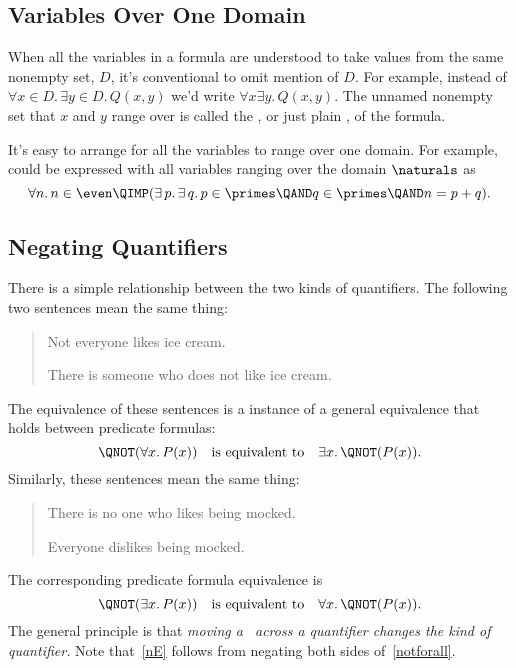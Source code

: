 \subsection{Variables Over One Domain}
When all the variables in a formula are understood to take values from the
same nonempty set, $D$, it's conventional to omit mention of $D$.  For
example, instead of $\forall x \in D.\, \exists y \in D.\, Q(x,y)$ we'd
write $\forall x \exists y.\, Q(x,y)$.  The unnamed nonempty set that $x$
and $y$ range over is called the , or just plain
, of the formula.

It's easy to arrange for all the variables to range over one domain.  For
example,  could be expressed with all variables
ranging over the domain $\naturals$ as
\[
\forall n.\, n \in \even \QIMP (\exists\, p.\, \exists\, q.\, p \in \primes \QAND
q \in \primes \QAND n = p + q).
\]

\subsection{Negating Quantifiers}

There is a simple relationship between the two kinds of quantifiers.  The
following two sentences mean the same thing:
%
\begin{quote}

Not everyone likes ice cream.

There is someone who does not like ice cream.

\end{quote}
The equivalence of these sentences is a instance of a general
equivalence that holds between predicate formulas:
%
\begin{equation}\label{notforall}
\QNOT(\forall x.\, P(x))
\quad \text{is equivalent to} \quad
\exists x.\, \QNOT(P(x)).
\end{equation}
%
Similarly, these sentences mean the same thing:
%
\begin{quote}
There is no one who likes being mocked.

Everyone dislikes being mocked.
\end{quote}
The corresponding predicate formula equivalence is
\begin{equation}\label{nE}
\QNOT(\exists x.\, P(x))
\quad \text{is equivalent to} \quad
\forall x.\, \QNOT(P(x)).
\end{equation}
The general principle is that \emph{moving a \QNOT\ across a
  quantifier changes the kind of quantifier.}  Note that~\eqref{nE}
follows from negating both sides of~\eqref{notforall}.


